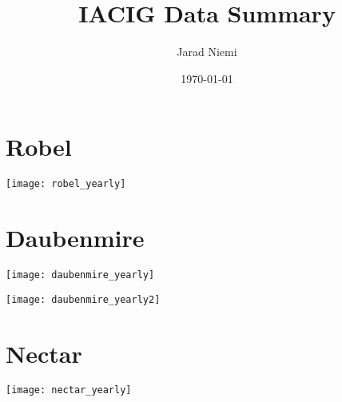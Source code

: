 \documentclass{article}
\title{IACIG Data Summary}
\author{Jarad Niemi}
\date{\today}
\begin{document}
\maketitle

\section{Robel}


\texttt{[image: robel\_yearly]}

\newpage
\section{Daubenmire}

\texttt{[image: daubenmire\_yearly]}

\texttt{[image: daubenmire\_yearly2]}

\clearpage
\section{Nectar}
\texttt{[image: nectar\_yearly]}
\end{document}
